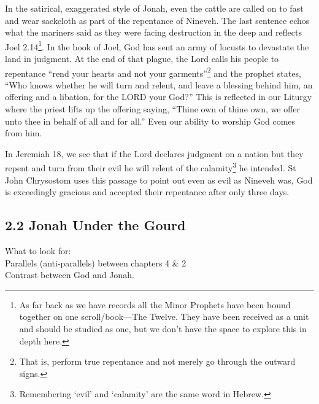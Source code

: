 \documentclass[
]{article}
\begin{document}
In the satirical, exaggerated style of Jonah, even the cattle are called
on to fast and wear sackcloth as part of the repentance of Nineveh. The
last sentence echos what the mariners said as they were facing
destruction in the deep and reflects Joel 2.14\footnote{As far back as
  we have records all the Minor Prophets have been bound together on one
  scroll/book---The Twelve. They have been received as a unit and should
  be studied as one, but we don't have the space to explore this in
  depth here.}. In the book of Joel, God has sent an army of locusts to
devastate the land in judgment. At the end of that plague, the Lord
calls his people to repentance ``rend your hearts and not your
garments''\footnote{That is, perform true repentance and not merely go
  through the outward signs.} and the prophet states, ``Who knows
whether he will turn and relent, and leave a blessing behind him, an
offering and a libation, for the LORD your God?'' This is reflected in
our Liturgy where the priest lifts up the offering saying, ``Thine own
of thine own, we offer unto thee in behalf of all and for all.'' Even
our ability to worship God comes from him.

In Jeremiah 18, we see that if the Lord declares judgment on a nation
but they repent and turn from their evil he will relent of the
calamity\footnote{Remembering `evil' and `calamity' are the same word in
  Hebrew.} he intended. St John Chrysostom uses this passage to point
out even as evil as Nineveh was, God is exceedingly gracious and
accepted their repentance after only three days.

\subsection{2.2 Jonah Under the Gourd}\label{jonah-under-the-gourd}

What to look for:\\
Parallels (anti-parallels) between chapters 4 \& 2\\
Contrast between God and Jonah.
\end{document}
